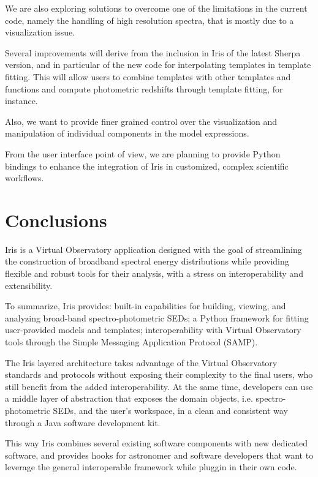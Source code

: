 \documentclass[final,5p]{elsarticle}
\begin{document}
We are also exploring solutions to overcome one of the limitations in the current code, namely the handling of high resolution spectra, that is mostly due to a visualization issue.

Several improvements will derive from the inclusion in Iris of the latest Sherpa version, and in particular of the new code for interpolating templates in template fitting. This will allow users to combine templates with other templates and functions and compute photometric redshifts through template fitting, for instance.

Also, we want to provide finer grained control over the visualization and manipulation of individual components in the model expressions.

From the user interface point of view, we are planning to provide Python bindings to enhance the integration of Iris in customized, complex scientific workflows.

\section{Conclusions}
\label{sec:conclusions}

Iris is a Virtual Observatory application designed with the goal of streamlining the construction of broadband spectral energy distributions while providing flexible and robust tools for their analysis, with a stress on interoperability and extensibility.

To summarize, Iris provides: built-in capabilities for building, viewing, and analyzing broad-band spectro-photometric SEDs; a Python framework for fitting user-provided models and templates; interoperability with Virtual Observatory tools through the Simple Messaging Application Protocol (SAMP).

The Iris layered architecture takes advantage of the Virtual Observatory standards and protocols without exposing their complexity to the final users, who still benefit from the added interoperability. At the same time, developers can use a middle layer of abstraction that exposes the domain objects, i.e. spectro-photometric SEDs, and the user's workspace, in a clean and consistent way through a Java software development kit.

This way Iris combines several existing software components with new dedicated software, and provides hooks for astronomer and software developers that want to leverage the general interoperable framework while pluggin in their own code.
\end{document}

